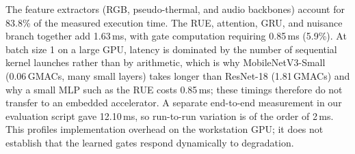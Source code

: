 \begin{table}[H]
\centering
\caption[Per-module inference latency of AdapFuse-v1]{Per-module inference latency of AdapFuse-v1 (batch 1, workstation GPU)}
\label{tab:latency_profile}
\end{table}

The feature extractors (RGB, pseudo-thermal, and audio backbones) account for 83.8\% of the measured execution time. The RUE, attention, GRU, and nuisance branch together add 1.63\,ms, with gate computation requiring 0.85\,ms (5.9\%). At batch size 1 on a large GPU, latency is dominated by the number of sequential kernel launches rather than by arithmetic, which is why MobileNetV3-Small (0.06\,GMACs, many small layers) takes longer than ResNet-18 (1.81\,GMACs) and why a small MLP such as the RUE costs 0.85\,ms; these timings therefore do not transfer to an embedded accelerator. A separate end-to-end measurement in our evaluation script gave 12.10\,ms, so run-to-run variation is of the order of 2\,ms. This profiles implementation overhead on the workstation GPU; it does not establish that the learned gates respond dynamically to degradation.

